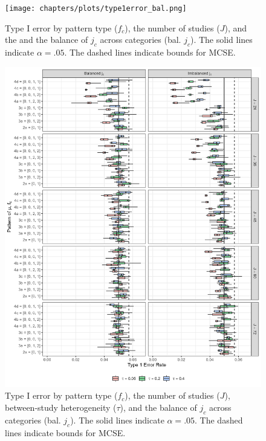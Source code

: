 \begin{figure}
    \centering
    \vspace{-5pt}\texttt{[image: chapters/plots/type1error\_bal.png]}\caption{Type I error by pattern type ($f_c$), the number of studies ($J$), and the and the balance of $j_c$ across categories (bal. $j_c$). The solid lines indicate $\alpha =.05$. The dashed lines indicate bounds for MCSE.\label{fig: type1error_bal}}
    \vspace{-5pt}
\end{figure}



\begin{figure}
    \centering
    \vspace{-5pt}\includegraphics[width=\linewidth]{chapters/plots/type1error_bal_tau_all.png}\caption{Type I error by pattern type ($f_c$), the number of studies ($J$), between-study heterogeneity ($\tau$), and the balance of $j_c$ across categories (bal. $j_c$). The solid lines indicate $\alpha =.05$. The dashed lines indicate bounds for MCSE. \label{fig: type1error_bal_tau}}
    \vspace{-5pt}
\end{figure}







